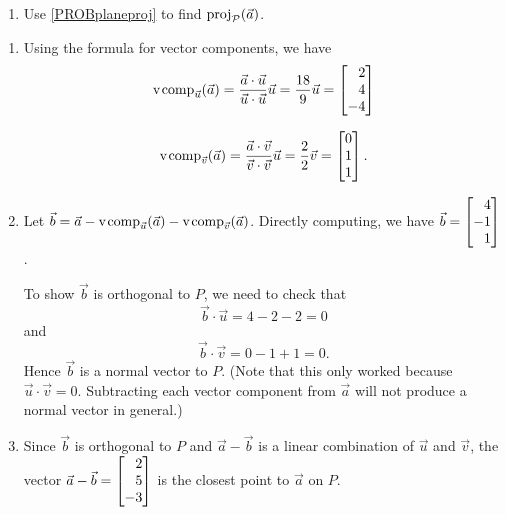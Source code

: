 \begin{exercises}
\begin{problist}
\begin{enumerate}
			\item Use \ref{PROBplaneproj} to find
				$\operatorname{proj}_{\mathcal P} (\vec a)$.
		\end{enumerate}


		\begin{solution}

			\begin{enumerate}
				\item Using the formula for vector components, we
					have
					\[
						\Comp_{\vec u}(\vec a) = \frac{\vec
						a \cdot \vec u}{\vec u \cdot
						\vec u}\vec u = \frac{18}{9}\vec
						u = \mat{2\\4\\-4}
					\]



					\[
						\Comp_{\vec v}(\vec a) = \frac{\vec
						a \cdot \vec v}{\vec v \cdot
						\vec v}\vec u = \frac{2}{2}\vec
						v = \mat{0\\1\\1}.
					\]


				\item Let $\vec b = \vec a-\operatorname{\operatorname{v\hspace{1pt}comp}}_{\vec u}(\vec a)-\operatorname{\operatorname{v\hspace{1pt}comp}}_{\vec
					v}(\vec a)$. Directly computing, we have
					$\vec b = \mat{ 4 \\-1 \\1 }$.

					To show $\vec b$ is orthogonal to $P$,
					we need to check that
					\[
						\vec b \cdot \vec u = 4-2-2 = 0
					\]
					 and
					\[
						\vec b \cdot \vec v = 0-1+1 = 0.
					\]
					 Hence $\vec b$ is a normal vector to
					$P$. (Note that this only worked because
					$\vec u\cdot \vec v = 0$. Subtracting
					each vector component from $\vec a$ will
					not produce a normal vector in general.)

				\item Since $\vec b$ is orthogonal to $P$ and $\vec
					a - \vec b$ is a linear combination of $\vec
					u$ and $\vec v$, the vector
					$\vec a - \vec b=\mat{2\\5\\-3}$ is the
					closest point to $\vec a$ on $P$.
			\end{enumerate}
		\end{solution}
	\end{problist}
\end{exercises}
